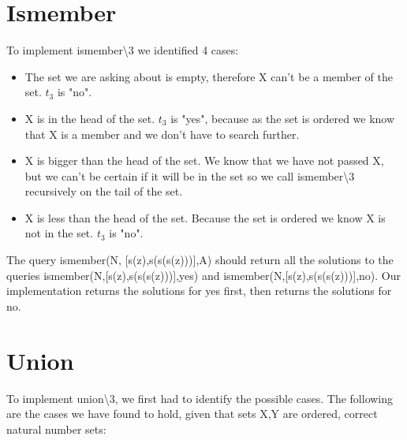 \documentclass[]{article}
\begin{document}
\section{Ismember} %
\label{sec:ismember}
To implement ismember\textbackslash3 we identified 4 cases:
\begin{itemize}
	\item The set we are asking about is empty, therefore X can't be a member of the set. $t_3$ is "no".
	\item X is in the head of the set. $t_3$ is "yes", because as the set is ordered we know that X is a member and we don't have to search further.
	\item X is bigger than the head of the set. We know that we have not passed X, but we can't be certain if it will be in the set so we call ismember\textbackslash3 recursively on the tail of the set.
	\item X is less than the head of the set. Because the set is ordered we know X is not in the set. $t_3$ is "no".
\end{itemize}
The query ismember(N, [s(z),s(s(s(z)))],A) should return all the solutions to the queries ismember(N,[s(z),s(s(s(z)))],yes) and ismember(N,[s(z),s(s(s(z)))],no). Our implementation returns the solutions for yes first, then returns the solutions for no. 
\section{Union} %
\label{sec:union}

To implement union\textbackslash3, we first had to identify the possible cases. The following are the cases we have found to hold, given that sets X,Y are ordered, correct natural number sets:
\end{document}
